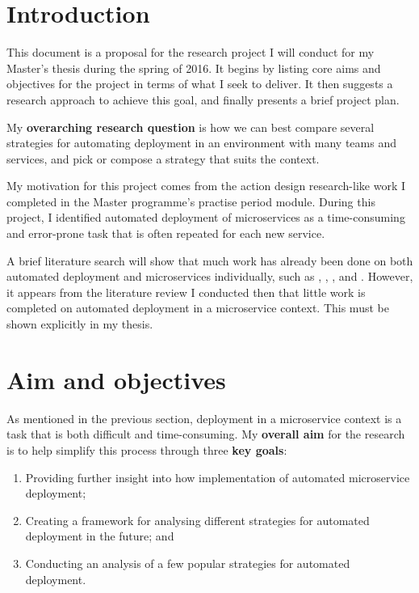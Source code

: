 \section{Introduction}

This document is a proposal for the research project I will conduct for my Master's thesis during the spring of 2016. It begins by listing core aims and objectives for the project in terms of what I seek to deliver. It then suggests a research approach to achieve this goal, and finally presents a brief project plan.

My \textbf{overarching research question} is how we can best compare several strategies for automating deployment in an environment with many teams and services, and pick or compose a strategy that suits the context.

My motivation for this project comes from the action design research-like work I completed in the Master programme's practise period module. During this project, I identified automated deployment of microservices as a time-consuming and error-prone task that is often repeated for each new service.

A brief literature search will show that much work has already been done on both automated deployment and microservices individually, such as \autocite{virmani:2015}, \autocite{stolberg}, \autocite{savchenko:2015}, and \autocite{le:2015}. However, it appears from the literature review I conducted then that little work is completed on automated deployment in a microservice context. This must be shown explicitly in my thesis.

\section{Aim and objectives}

As mentioned in the previous section, deployment in a microservice context is a task that is both difficult and time-consuming. My \textbf{overall aim} for the research is to help simplify this process through three \textbf{key goals}:

\begin{enumerate}
  \item Providing further insight into how implementation of automated microservice deployment;
  \item Creating a framework for analysing different strategies for automated deployment in the future; and
  \item Conducting an analysis of a few popular strategies for automated deployment.
\end{enumerate}

